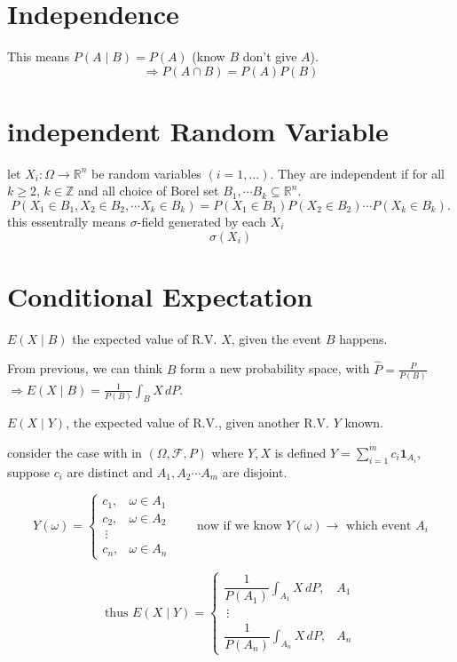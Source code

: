 \documentclass[
  letterpaper,
  DIV=11,
  numbers=noendperiod]{scrreprt}
\theoremstyle{definition}
\theoremstyle{plain}
\theoremstyle{plain}
\theoremstyle{definition}
\theoremstyle{plain}
\theoremstyle{plain}
\theoremstyle{remark}
\begin{document}
\section{Independence}\label{independence}

This means \(P(A \mid B) = P(A)\) (know \(B\) don't give \(A\)). \[
\Rightarrow P(A \cap B) = P(A) P(B)
\]

\section{independent Random Variable}\label{independent-random-variable}

let \(X_i : \Omega \to \mathbb{R}^n\) be random variables
\((i = 1, \dots)\). They are independent if for all \(k \geq 2\),
\(k \in \mathbb{Z}\) and all choice of Borel set
\(B_1, \cdots B_k \subseteq \mathbb{R}^n\). \[
P(X_1 \in B_1, X_2 \in B_2, \cdots X_k \in B_k) = P(X_1 \in B_1) P(X_2 \in B_2) \cdots P(X_k \in B_k).
\] this essentrally means \(\sigma\)-field generated by each \(X_i\) \[
\sigma(X_i)
\]

\section{Conditional Expectation}\label{conditional-expectation}

\(E(X \mid B)\) the expected value of R.V. \(X\), given the event \(B\)
happens.

From previous, we can think \(B\) form a new probability space, with
\(\hat{P} = \frac{P}{P(B)}\)
\(\Rightarrow E(X \mid B) = \frac{1}{P(B)} \int_B X \, dP\).

\(E(X \mid Y)\), the expected value of R.V., given another R.V. \(Y\)
known.

consider the case with in \((\Omega, \mathcal{F}, P)\) where \(Y, X\) is
defined \(Y = \sum_{i=1}^{m} c_i \mathbf{1}_{A_i}\), suppose \(c_i\) are
distinct and \(A_1, A_2 \cdots A_m\) are disjoint.

\[
Y(\omega) = \begin{cases} c_1, & \omega \in A_1 \\ c_2, & \omega \in A_2 \\ \ \vdots \\ c_n, & \omega \in A_n \end{cases}
\qquad \text{now if we know } Y(\omega) \to \text{ which event } A_i
\]

\[
\text{thus } E(X \mid Y) = \begin{cases} \dfrac{1}{P(A_1)} \displaystyle\int_{A_1} X \, dP, & A_1 \\ \ \vdots \\ \dfrac{1}{P(A_n)} \displaystyle\int_{A_n} X \, dP, & A_n \end{cases}
\]
\end{document}
